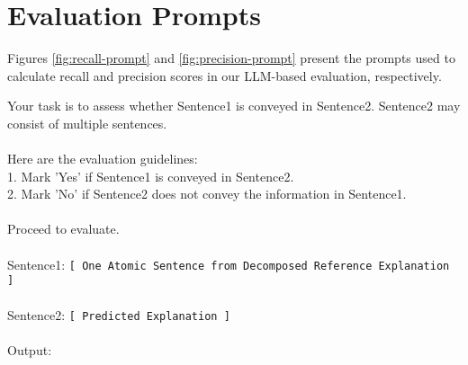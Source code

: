 \section{Evaluation Prompts}
\label{app:eval-prompts}
Figures \ref{fig:recall-prompt} and \ref{fig:precision-prompt} present the prompts used to calculate recall and precision scores in our LLM-based evaluation, respectively.

\begin{figure*}[t]
\small
\begin{tcolorbox}[
    title=Prompt for Evaluating Recall Score,
    colback=white,
    colframe=MidnightBlue,
    arc=0pt,        %
    outer arc=0pt,  %
]

Your task is to assess whether \text{[}Sentence1\text{]} is conveyed in \text{[}Sentence2\text{]}. \text{[}Sentence2\text{]} may consist of multiple sentences.\\
\\
Here are the evaluation guidelines:\\
1. Mark 'Yes' if \text{[}Sentence1\text{]} is conveyed in \text{[}Sentence2\text{]}.\\
2. Mark 'No' if \text{[}Sentence2\text{]} does not convey the information in \text{[}Sentence1\text{]}.\\
\\
Proceed to evaluate. \\
\\
\text{[}Sentence1\text{]}: \texttt{[ One Atomic Sentence from Decomposed Reference Explanation ]} \\
\\
\text{[}Sentence2\text{]}: \texttt{[ Predicted Explanation ]}\\
\\
\text{[}Output\text{]}:

\end{tcolorbox}
\caption{Prompt for evaluating recall score.} %
\label{fig:recall-prompt}
\end{figure*}


